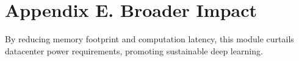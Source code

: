 \section*{Appendix E. Broader Impact}
By reducing memory footprint and computation latency, this module curtails datacenter power requirements, promoting sustainable deep learning.

